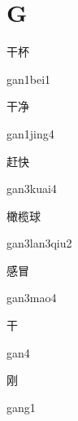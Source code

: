 ﻿%
\section*{G}
\begin{multicols*}{2}

\begin{verbete}{干杯}
\begin{pronuncia}{gan1bei1}
\end{pronuncia}
\end{verbete}

\begin{verbete}{干净}
\begin{pronuncia}{gan1jing4}
\end{pronuncia}
\end{verbete}

\begin{verbete}{赶快}
\begin{pronuncia}{gan3kuai4}
\end{pronuncia}
\end{verbete}

\begin{verbete}{橄榄球}
\begin{pronuncia}{gan3lan3qiu2}
\end{pronuncia}
\end{verbete}

\begin{verbete}{感冒}
\begin{pronuncia}{gan3mao4}
\end{pronuncia}
\end{verbete}

\begin{verbete}[gan4]{干}
\begin{pronuncia}{gan4}
\end{pronuncia}
\end{verbete}

\begin{verbete}[gang1]{刚}
\begin{pronuncia}{gang1}
\end{pronuncia}
\end{verbete}


\end{multicols*}
